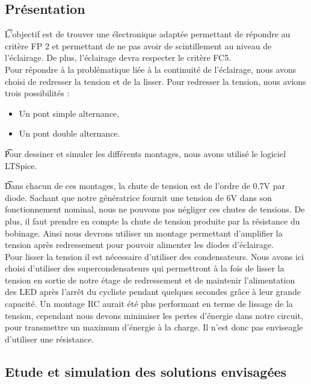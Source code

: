 \documentclass[a4paper,12pt]{article} %
\begin{document}
\subsection{Présentation}

\t L'objectif est de trouver une électronique adaptée permettant de répondre au critère FP 2 et permettant de ne pas avoir de scintillement au niveau de l'éclairage. De plus, l'éclairage devra respecter le critère FC5. \\

Pour répondre à la problématique liée à la continuité de l'éclairage, nous avons choisi de redresser la tension et de la lisser. Pour redresser la tension, nous avions trois possibilités  :

\begin{itemize}
\item Un pont simple alternance,
\item Un pont double alternance.
\end{itemize}

\t Pour dessiner et simuler les différents montages, nous avons utilisé le logiciel LTSpice.

\t Dans chacun de ces montages, la chute de tension est de l'ordre de 0.7V par diode. Sachant que notre génératrice fournit une tension de 6V dans son fonctionnement nominal, nous ne pouvons pas négliger ces chutes de tensions. De plus, il faut prendre en compte la chute de tension produite par la résistance du bobinage. Ainsi nous devrons utiliser un montage permettant d'amplifier la tension après redressement pour pouvoir alimenter les diodes d'éclairage.\\

	Pour lisser la tension il est nécessaire d'utiliser des condensateurs. Nous avons ici choisi d'utiliser des supercondensateurs qui permettront à la fois de lisser la tension en sortie de notre étage de redressement et de maintenir l’alimentation des LED après l'arrêt du cycliste pendant quelques secondes grâce à leur grande capacité. Un montage RC aurait été plus performant en terme de lissage de la tension, cependant nous devons minimiser les pertes d'énergie dans notre circuit, pour transmettre un maximum d'énergie à la charge. Il n'est donc pas enviseagle d'utiliser une résistance.


\subsection{Etude et simulation des solutions envisagées}
\end{document}
